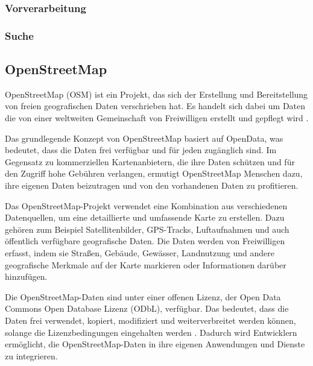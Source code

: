 \subsubsection{Vorverarbeitung}


\subsubsection{Suche}

\subsection{OpenStreetMap}
OpenStreetMap (OSM) ist ein Projekt, das sich der Erstellung und Bereitstellung von freien
geografischen Daten verschrieben hat. Es handelt sich dabei um Daten die von einer weltweiten
Gemeinschaft von Freiwilligen erstellt und gepflegt wird \cite{osm.about}.

Das grundlegende Konzept von OpenStreetMap basiert auf OpenData, was bedeutet, dass die Daten frei
verfügbar und für jeden zugänglich sind. Im Gegensatz zu kommerziellen Kartenanbietern, die ihre
Daten schützen und für den Zugriff hohe Gebühren verlangen, ermutigt OpenStreetMap Menschen dazu,
ihre eigenen Daten beizutragen und von den vorhandenen Daten zu profitieren.

Das OpenStreetMap-Projekt verwendet eine Kombination aus verschiedenen Datenquellen, um eine
detaillierte und umfassende Karte zu erstellen. Dazu gehören zum Beispiel Satellitenbilder,
GPS-Tracks, Luftaufnahmen und auch öffentlich verfügbare geografische Daten. Die Daten werden von
Freiwilligen erfasst, indem sie Straßen, Gebäude, Gewässer, Landnutzung und andere geografische
Merkmale auf der Karte markieren oder Informationen darüber hinzufügen.

Die OpenStreetMap-Daten sind unter einer offenen Lizenz, der Open Data Commons Open Database Lizenz
(ODbL), verfügbar. Das bedeutet, dass die Daten frei verwendet, kopiert, modifiziert und
weiterverbreitet werden können, solange die Lizenzbedingungen eingehalten werden \cite{osm.license}.
Dadurch wird Entwicklern ermöglicht, die OpenStreetMap-Daten in ihre eigenen Anwendungen und
Dienste zu integrieren.